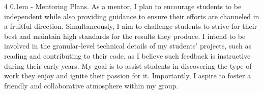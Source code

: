\documentclass[10pt]{article}
\makeatletter
\def \paragraph {%
    \@startsection{paragraph}%
        {4}%
        \z@%
        {0.1em}
        {-\fontdimen 6 \font}%
        {\normalfont \bfseries}%
    }
\makeatother
\begin{document}
\paragraph{Mentoring Plans.}
As a mentor, I plan to encourage students to be independent while also providing guidance to ensure their efforts are channeled in a fruitful direction. Simultaneously, I aim to challenge students to strive for their best and maintain high standards for the results they produce. I intend to be involved in the granular-level technical details of my students' projects, such as reading and contributing to their code, as I believe such feedback is instructive during their early years. My goal is to assist students in discovering the type of work they enjoy and ignite their passion for it. Importantly, I aspire to foster a friendly and collaborative atmosphere within my group.
\end{document}
